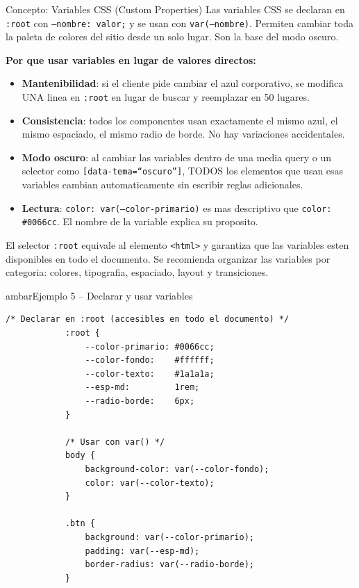 \documentclass[11pt,a4paper]{article}
\begin{document}
	\begin{cajaconcepto}{Concepto: Variables CSS (Custom Properties)}
		Las variables CSS se declaran en \texttt{:root} con \texttt{--nombre: valor;} y se usan con \texttt{var(--nombre)}. Permiten cambiar toda la paleta de colores del sitio desde un solo lugar. Son la base del modo oscuro.
		
		\textbf{Por que usar variables en lugar de valores directos:}
		\begin{itemize}[leftmargin=1.2em,itemsep=3pt]
			\item \textbf{Mantenibilidad}: si el cliente pide cambiar el azul corporativo, se modifica UNA linea en \texttt{:root} en lugar de buscar y reemplazar en 50 lugares.
			\item \textbf{Consistencia}: todos los componentes usan exactamente el mismo azul, el mismo espaciado, el mismo radio de borde. No hay variaciones accidentales.
			\item \textbf{Modo oscuro}: al cambiar las variables dentro de una media query o un selector como \texttt{[data-tema=``oscuro'']}, TODOS los elementos que usan esas variables cambian automaticamente sin escribir reglas adicionales.
			\item \textbf{Lectura}: \texttt{color: var(--color-primario)} es mas descriptivo que \texttt{color: \#0066cc}. El nombre de la variable explica su proposito.
		\end{itemize}
		
		El selector \texttt{:root} equivale al elemento \texttt{<html>} y garantiza que las variables esten disponibles en todo el documento. Se recomienda organizar las variables por categoria: colores, tipografia, espaciado, layout y transiciones.
	\end{cajaconcepto}
	
	\begin{cajacodigo}{ambar}{Ejemplo 5 -- Declarar y usar variables}
		\begin{lstlisting}[style=codecss]
			/* Declarar en :root (accesibles en todo el documento) */
			:root {
				--color-primario: #0066cc;
				--color-fondo:    #ffffff;
				--color-texto:    #1a1a1a;
				--esp-md:         1rem;
				--radio-borde:    6px;
			}
			
			/* Usar con var() */
			body {
				background-color: var(--color-fondo);
				color: var(--color-texto);
			}
			
			.btn {
				background: var(--color-primario);
				padding: var(--esp-md);
				border-radius: var(--radio-borde);
			}
		\end{lstlisting}
	\end{cajacodigo}
	
\end{document}

